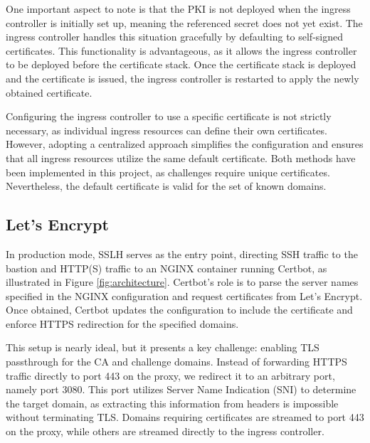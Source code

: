 One important aspect to note is that the PKI is not deployed when the ingress controller is initially set up, meaning the referenced secret does not yet exist. The ingress controller handles this situation gracefully by defaulting to self-signed certificates. This functionality is advantageous, as it allows the ingress controller to be deployed before the certificate stack. Once the certificate stack is deployed and the certificate is issued, the ingress controller is restarted to apply the newly obtained certificate.

Configuring the ingress controller to use a specific certificate is not strictly necessary, as individual ingress resources can define their own certificates. However, adopting a centralized approach simplifies the configuration and ensures that all ingress resources utilize the same default certificate. Both methods have been implemented in this project, as challenges require unique certificates. Nevertheless, the default certificate is valid for the set of known domains.

\subsection{Let's Encrypt}\label{sec:letsencrypt} 
In production mode, SSLH serves as the entry point, directing SSH traffic to the bastion and HTTP(S) traffic to an NGINX container running Certbot, as illustrated in Figure \ref{fig:architecture}. Certbot's role is to parse the server names specified in the NGINX configuration and request certificates from Let's Encrypt. Once obtained, Certbot updates the configuration to include the certificate and enforce HTTPS redirection for the specified domains.

This setup is nearly ideal, but it presents a key challenge: enabling TLS passthrough for the CA and challenge domains. Instead of forwarding HTTPS traffic directly to port 443 on the proxy, we redirect it to an arbitrary port, namely port 3080. This port utilizes Server Name Indication (SNI) to determine the target domain, as extracting this information from headers is impossible without terminating TLS. Domains requiring certificates are streamed to port 443 on the proxy, while others are streamed directly to the ingress controller.

